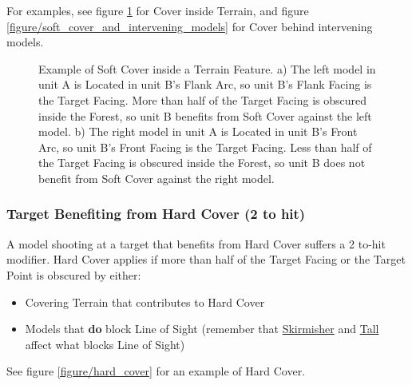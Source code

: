 For examples, see figure \ref{figure/cover_inside_terrain} for Cover inside Terrain, and figure \ref{figure/soft_cover_and_intervening_models} for Cover behind intervening models.

\newcommand{\figCITA}{a)}
\newcommand{\figCITB}{b)}

\begin{figure}[!htbp]
	\renewcommand{\figbiglettersize}{20}
	\vspace*{10pt}
	\centering
	\def\svgwidth{0.8\textwidth}
	
	\caption{%
		Example of Soft Cover inside a Terrain Feature.\captionpar
		a) The left model in unit A is Located in unit B's Flank Arc, so unit B's Flank Facing is the Target Facing. More than half of the Target Facing is obscured inside the Forest, so unit B benefits from Soft Cover against the left model.\captionpar
		b) The right model in unit A is Located in unit B's Front Arc, so unit B's Front Facing is the Target Facing. Less than half of the Target Facing is obscured inside the Forest, so unit B does not benefit from Soft Cover against the right model.%
	}
	\label{figure/cover_inside_terrain}
\end{figure}

\subsubsection{Target Benefiting from Hard Cover (\minuss{}2 to hit)}

A model shooting at a target that benefits from Hard Cover suffers a \minuss{}2 to-hit modifier. Hard Cover applies if more than half of the Target Facing or the Target Point is obscured by either:
\begin{itemize}
\item Covering Terrain that contributes to Hard Cover
\item Models that \textbf{do} block Line of Sight (remember that \hyperref[skirmisher]{Skirmisher} and \hyperref[tall]{Tall} affect what blocks Line of Sight)
\end{itemize}

See figure \ref{figure/hard_cover} for an example of Hard Cover.

